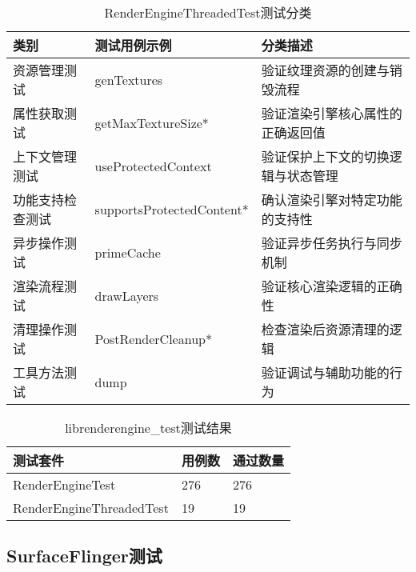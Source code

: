 \begin{table}[H]
    \centering
    \caption{RenderEngineThreadedTest测试分类}
    \label{tab:RenderEngineThreadedTest测试分类}
    \begin{tabular}{lll}
      \toprule
      类别 & 测试用例示例 & 分类描述 \\
      \midrule
      资源管理测试 & genTextures & 验证纹理资源的创建与销毁流程 \\
      属性获取测试 & getMaxTextureSize* & 验证渲染引擎核心属性的正确返回值 \\
      上下文管理测试 & useProtectedContext & 验证保护上下文的切换逻辑与状态管理 \\
      功能支持检查测试 & supportsProtectedContent* & 确认渲染引擎对特定功能的支持性 \\
      异步操作测试 & primeCache & 验证异步任务执行与同步机制 \\
      渲染流程测试 & drawLayers & 验证核心渲染逻辑的正确性 \\
      清理操作测试 & PostRenderCleanup* & 检查渲染后资源清理的逻辑 \\
      工具方法测试 & dump & 验证调试与辅助功能的行为 \\
      \bottomrule
    \end{tabular}
    \note{}
\end{table}

\begin{table}[H]
    \centering
    \caption{librenderengine\_test测试结果}
    \label{tab:librenderengine_test测试结果}
    \begin{tabular}{lll}
      \toprule
      测试套件 & 用例数 & 通过数量 \\
      \midrule
      RenderEngineTest & 276 & 276 \\
      RenderEngineThreadedTest & 19 & 19 \\
      \bottomrule
    \end{tabular}
    \note{}
\end{table}

\subsection{SurfaceFlinger测试}

